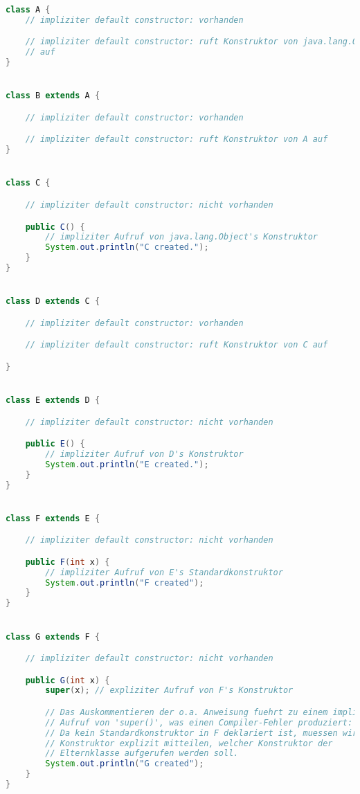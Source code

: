 \begin{lstlisting}[language=java]
class A {
    // impliziter default constructor: vorhanden

    // impliziter default constructor: ruft Konstruktor von java.lang.Object
    // auf
}


class B extends A {

    // impliziter default constructor: vorhanden

    // impliziter default constructor: ruft Konstruktor von A auf
}


class C {

    // impliziter default constructor: nicht vorhanden

    public C() {
        // impliziter Aufruf von java.lang.Object's Konstruktor
        System.out.println("C created.");
    }
}


class D extends C {

    // impliziter default constructor: vorhanden

    // impliziter default constructor: ruft Konstruktor von C auf

}


class E extends D {

    // impliziter default constructor: nicht vorhanden

    public E() {
        // impliziter Aufruf von D's Konstruktor
        System.out.println("E created.");
    }
}


class F extends E {

    // impliziter default constructor: nicht vorhanden

    public F(int x) {
        // impliziter Aufruf von E's Standardkonstruktor
        System.out.println("F created");
    }
}


class G extends F {

    // impliziter default constructor: nicht vorhanden

    public G(int x) {
        super(x); // expliziter Aufruf von F's Konstruktor

        // Das Auskommentieren der o.a. Anweisung fuehrt zu einem impliziten
        // Aufruf von 'super()', was einen Compiler-Fehler produziert:
        // Da kein Standardkonstruktor in F deklariert ist, muessen wir dem
        // Konstruktor explizit mitteilen, welcher Konstruktor der
        // Elternklasse aufgerufen werden soll.
        System.out.println("G created");
    }
}
\end{lstlisting}